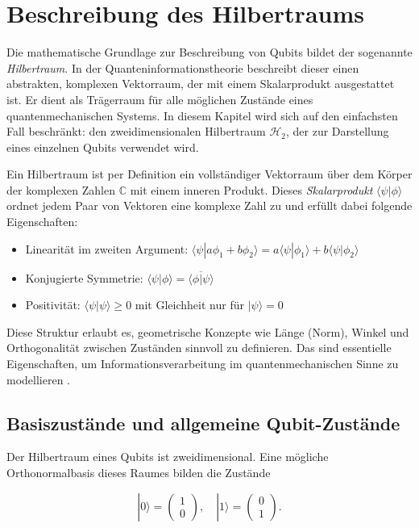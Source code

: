\section*{Beschreibung des Hilbertraums}

Die mathematische Grundlage zur Beschreibung von Qubits bildet der sogenannte \textit{Hilbertraum}. In der Quanteninformationstheorie beschreibt dieser einen abstrakten, komplexen Vektorraum, der mit einem Skalarprodukt ausgestattet ist. Er dient als Trägerraum für alle möglichen Zustände eines quantenmechanischen Systems. In diesem Kapitel wird sich auf den einfachsten Fall beschränkt: den zweidimensionalen Hilbertraum $\mathcal{H}_2$, der zur Darstellung eines einzelnen Qubits verwendet wird.

Ein Hilbertraum ist per Definition ein vollständiger Vektorraum über dem Körper der komplexen Zahlen $\mathbb{C}$ mit einem inneren Produkt. Dieses \textit{Skalarprodukt} $\langle \psi | \phi \rangle$ ordnet jedem Paar von Vektoren eine komplexe Zahl zu und erfüllt dabei folgende Eigenschaften:

\begin{itemize}
    \item Linearität im zweiten Argument: $\langle \psi | a \phi_1 + b \phi_2 \rangle = a \langle \psi | \phi_1 \rangle + b \langle \psi | \phi_2 \rangle$
    \item Konjugierte Symmetrie: $\langle \psi | \phi \rangle = \overline{\langle \phi | \psi \rangle}$
    \item Positivität: $\langle \psi | \psi \rangle \geq 0$ mit Gleichheit nur für $|\psi\rangle = 0$
\end{itemize}

Diese Struktur erlaubt es, geometrische Konzepte wie Länge (Norm), Winkel und Orthogonalität zwischen Zuständen sinnvoll zu definieren. Das sind essentielle Eigenschaften, um Informationsverarbeitung im quantenmechanischen Sinne zu modellieren \cite{nielsen2002quantum}.

\subsection*{Basiszustände und allgemeine Qubit-Zustände}
Der Hilbertraum eines Qubits ist zweidimensional. Eine mögliche Orthonormalbasis dieses Raumes bilden die Zustände

\begin{equation}
|0\rangle = \begin{pmatrix} 1 \\ 0 \end{pmatrix}, \quad |1\rangle = \begin{pmatrix} 0 \\ 1 \end{pmatrix}.
\end{equation}

